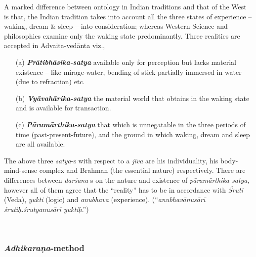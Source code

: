 A marked difference between ontology in Indian traditions and that of the West is that, the Indian tradition takes into account all the three states of experience -- waking, dream \& sleep -- into consideration; whereas Western Science and philosophies examine only the waking state predominantly. Three realities are accepted in Advaita-vedānta viz.,
\begin{itemize}
\item[(a)] {{\sl\bfseries Prātibhāsika-satya}\relax}  available only for perception but lacks material existence -- like mirage-water, bending of stick partially immersed in water (due to refraction) etc.

\item[(b)] {{\sl\bfseries Vyāvahārika-satya}\relax}  the material world that obtains in the waking state and is available for transaction.

\newpage

\item[(c)] {{\sl\bfseries Pāramārthika-satya}\relax} that which is unnegatable in the three periods of time (past-present-future), and the ground in which waking, dream and sleep are all available.
\end{itemize}

The above three {\sl satya}-s with respect to a {\sl jīva} are his individuality, his body-mind-sense complex and Brahman (the essential nature) respectively. There are differences between {\sl darśana}-s on the nature and existence of {\sl pāramārthika-satya}, however all of them agree that the ``reality'' has to be in accordance with {\sl Śruti} (Veda), {\sl yukti} (logic) and {\sl anubhava} (experience). (``{\sl anubhavānusārī śrutiḥ.śrutyanusārī yuktiḥ}.'')

~
\subsubsection{{{\sl\bfseries Adhikaraṇa}\relax}-method}

